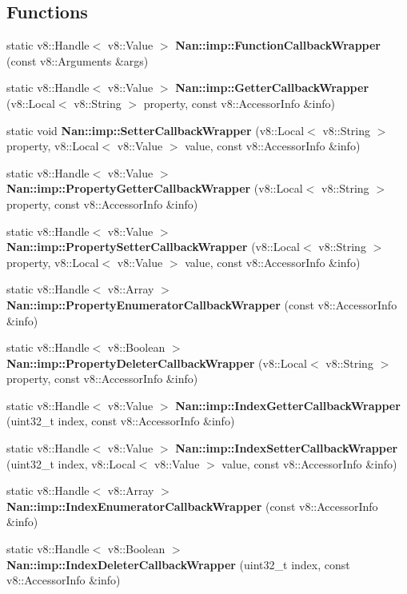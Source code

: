 \subsection*{Functions}
\begin{DoxyCompactItemize}
\item 
static v8\+::\+Handle$<$ v8\+::\+Value $>$ \textbf{ Nan\+::imp\+::\+Function\+Callback\+Wrapper} (const v8\+::\+Arguments \&args)
\item 
static v8\+::\+Handle$<$ v8\+::\+Value $>$ \textbf{ Nan\+::imp\+::\+Getter\+Callback\+Wrapper} (v8\+::\+Local$<$ v8\+::\+String $>$ property, const v8\+::\+Accessor\+Info \&info)
\item 
static void \textbf{ Nan\+::imp\+::\+Setter\+Callback\+Wrapper} (v8\+::\+Local$<$ v8\+::\+String $>$ property, v8\+::\+Local$<$ v8\+::\+Value $>$ value, const v8\+::\+Accessor\+Info \&info)
\item 
static v8\+::\+Handle$<$ v8\+::\+Value $>$ \textbf{ Nan\+::imp\+::\+Property\+Getter\+Callback\+Wrapper} (v8\+::\+Local$<$ v8\+::\+String $>$ property, const v8\+::\+Accessor\+Info \&info)
\item 
static v8\+::\+Handle$<$ v8\+::\+Value $>$ \textbf{ Nan\+::imp\+::\+Property\+Setter\+Callback\+Wrapper} (v8\+::\+Local$<$ v8\+::\+String $>$ property, v8\+::\+Local$<$ v8\+::\+Value $>$ value, const v8\+::\+Accessor\+Info \&info)
\item 
static v8\+::\+Handle$<$ v8\+::\+Array $>$ \textbf{ Nan\+::imp\+::\+Property\+Enumerator\+Callback\+Wrapper} (const v8\+::\+Accessor\+Info \&info)
\item 
static v8\+::\+Handle$<$ v8\+::\+Boolean $>$ \textbf{ Nan\+::imp\+::\+Property\+Deleter\+Callback\+Wrapper} (v8\+::\+Local$<$ v8\+::\+String $>$ property, const v8\+::\+Accessor\+Info \&info)
\item 
static v8\+::\+Handle$<$ v8\+::\+Value $>$ \textbf{ Nan\+::imp\+::\+Index\+Getter\+Callback\+Wrapper} (uint32\+\_\+t index, const v8\+::\+Accessor\+Info \&info)
\item 
static v8\+::\+Handle$<$ v8\+::\+Value $>$ \textbf{ Nan\+::imp\+::\+Index\+Setter\+Callback\+Wrapper} (uint32\+\_\+t index, v8\+::\+Local$<$ v8\+::\+Value $>$ value, const v8\+::\+Accessor\+Info \&info)
\item 
static v8\+::\+Handle$<$ v8\+::\+Array $>$ \textbf{ Nan\+::imp\+::\+Index\+Enumerator\+Callback\+Wrapper} (const v8\+::\+Accessor\+Info \&info)
\item 
static v8\+::\+Handle$<$ v8\+::\+Boolean $>$ \textbf{ Nan\+::imp\+::\+Index\+Deleter\+Callback\+Wrapper} (uint32\+\_\+t index, const v8\+::\+Accessor\+Info \&info)

\end{DoxyCompactItemize}
